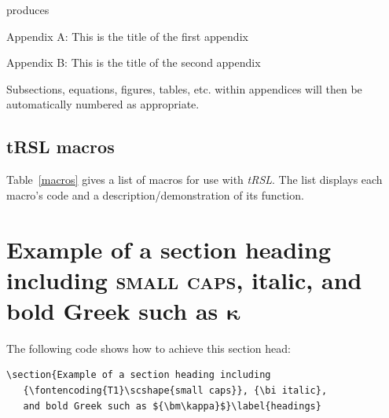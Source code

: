 \documentclass[]{tRSL2e}
\begin{document}
\noindent produces\medskip

\noindent Appendix A: This is the title of the first appendix

\noindent Appendix B: This is the title of the second appendix

\medskip
Subsections, equations, figures, tables, etc. within
appendices will then be automatically numbered as appropriate.

\subsection{{\bi tRSL} macros}

Table~\ref{macros} gives a list of macros for use with {\it tRSL}. The list displays each macro's code and a
description/demonstration of its function.

\begin{table} 
\label{macros}
\end{table}

\section{Example of a section heading including
   {\scshape{small caps}}, {\bi italic},
   and bold Greek such as ${\bm\kappa}$}\label{headings}

%
The following code shows how to achieve this section head:
%
\begin{verbatim}
\section{Example of a section heading including
   {\fontencoding{T1}\scshape{small caps}}, {\bi italic},
   and bold Greek such as ${\bm\kappa}$}\label{headings}
\end{verbatim}
%
%
\end{document}
